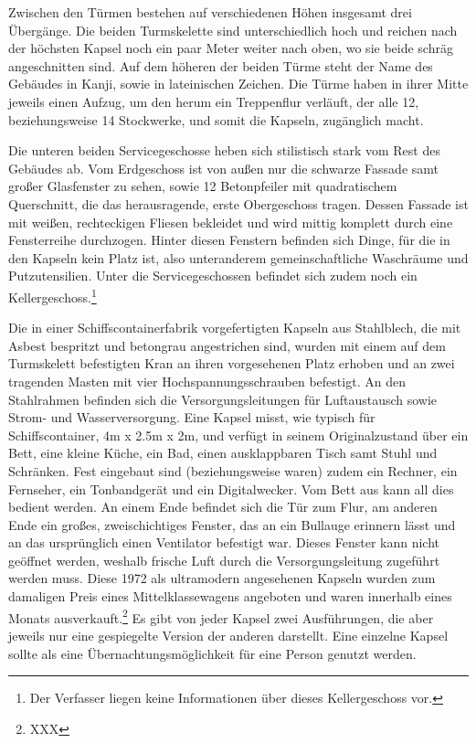 \documentclass[a4paper, 12pt]{article}
\begin{document}
\begin{onehalfspace}
Zwischen den Türmen bestehen auf verschiedenen Höhen insgesamt drei Übergänge. Die beiden Turmskelette sind unterschiedlich hoch und reichen nach der höchsten Kapsel noch ein paar Meter weiter nach oben, wo sie beide schräg angeschnitten sind. Auf dem höheren der beiden Türme steht der Name des Gebäudes in Kanji, sowie in lateinischen Zeichen. Die Türme haben in ihrer Mitte jeweils einen Aufzug, um den herum ein Treppenflur verläuft, der alle 12, beziehungsweise 14 Stockwerke, und somit die Kapseln, zugänglich macht.

Die unteren beiden Servicegeschosse heben sich stilistisch stark vom Rest des Gebäudes ab. Vom Erdgeschoss ist von außen nur die schwarze Fassade samt großer Glasfenster zu sehen, sowie 12 Betonpfeiler mit quadratischem Querschnitt, die das herausragende, erste Obergeschoss tragen. Dessen Fassade ist mit weißen, rechteckigen Fliesen bekleidet und wird mittig komplett durch eine Fensterreihe durchzogen. Hinter diesen Fenstern befinden sich Dinge, für die in den Kapseln kein Platz ist, also unteranderem gemeinschaftliche Waschräume und Putzutensilien. Unter die Servicegeschossen befindet sich zudem noch ein Kellergeschoss.\footnote{Der Verfasser liegen keine Informationen über dieses Kellergeschoss vor.}

Die in einer Schiffscontainerfabrik vorgefertigten Kapseln aus Stahlblech, die mit Asbest bespritzt und betongrau angestrichen sind, wurden mit einem auf dem Turmskelett befestigten Kran an ihren vorgesehenen Platz erhoben und an zwei tragenden Masten mit vier Hochspannungsschrauben befestigt. An den Stahlrahmen befinden sich die Versorgungsleitungen für Luftaustausch sowie Strom- und Wasserversorgung. Eine Kapsel misst, wie typisch für Schiffscontainer, 4m x 2.5m x 2m, und verfügt in seinem Originalzustand über ein Bett, eine kleine Küche, ein Bad, einen ausklappbaren Tisch samt Stuhl und Schränken. Fest eingebaut sind (beziehungsweise waren) zudem ein Rechner, ein Fernseher, ein Tonbandgerät und ein Digitalwecker. Vom Bett aus kann all dies bedient werden. An einem Ende befindet sich die Tür zum Flur, am anderen Ende ein großes, zweischichtiges Fenster, das an ein Bullauge erinnern lässt und an das ursprünglich einen Ventilator befestigt war. Dieses Fenster kann nicht geöffnet werden, weshalb frische Luft durch die Versorgungsleitung zugeführt werden muss. Diese 1972 als ultramodern angesehenen Kapseln wurden zum damaligen Preis eines Mittelklassewagens angeboten und waren innerhalb eines Monats ausverkauft.\footnote{XXX} Es gibt von jeder Kapsel zwei Ausführungen, die aber jeweils nur eine gespiegelte Version der anderen darstellt. Eine einzelne Kapsel sollte als eine Übernachtungsmöglichkeit für eine Person genutzt werden. 


\end{onehalfspace}
\end{document}
